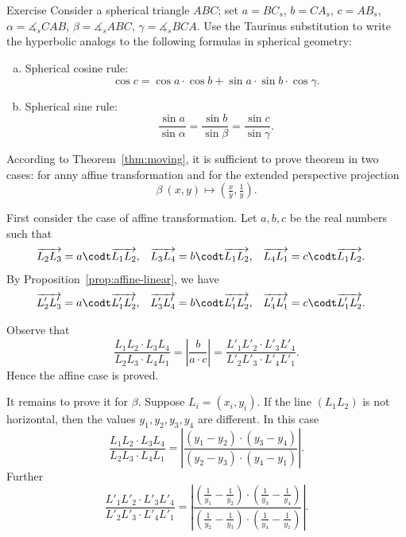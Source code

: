 \begin{thm}{Exercise}
Consider a spherical triangle $ABC$; set
$a=BC_s$, $b=CA_s$, $c=AB_s$,
$\alpha=\measuredangle_sCAB$, $\beta=\measuredangle_sABC$, $\gamma=\measuredangle_sBCA$.
Use the Taurinus substitution to write the hyperbolic analogs to the following formulas in spherical geometry:

\begin{enumerate}[(a)]
\item Spherical cosine rule:
\[\cos c=\cos a \cdot \cos b+\sin a\cdot \sin b\cdot \cos\gamma.\]
\item
Spherical sine rule:
\[\frac{\sin a}{\sin \alpha}=\frac{\sin b}{\sin \beta}=\frac{\sin c}{\sin \gamma}.\]
\end{enumerate}
 
\end{thm}















According to Theorem~\ref{thm:moving}, it is sufficient to prove theorem in two cases: for anny affine transformation and for the extended perspective projection
\[\beta\:(x,y)\mapsto (\tfrac xy,\tfrac 1y).\]

First consider the case of affine transformation.
Let $a,b,c$ be the real numbers such that
\begin{align*}\overrightarrow{L_2L_3}&=a\codt\overrightarrow{L_1L_2},& \overrightarrow{L_3L_4}&=b\codt\overrightarrow{L_1L_2},&
\overrightarrow{L_4L_1}&=c\codt\overrightarrow{L_1L_2}.
\end{align*}
By Proposition~\ref{prop:affine-linear}, we have 
\begin{align*}
\overrightarrow{L_2'L_3'}&=a\codt\overrightarrow{L_1'L_2'},& \overrightarrow{L_3'L_4'}&=b\codt\overrightarrow{L_1'L_2'},&
\overrightarrow{L_4'L_1'}&=c\codt\overrightarrow{L_1'L_2'}.
\end{align*}

Observe that 
\[\frac{L_1L_2\cdot L_3L_4}{L_2L_3\cdot L_4L_1}
=\left|\frac{b}{a\cdot c}\right|
=\frac{L'_1L'_2\cdot L'_3L'_4}{L'_2L'_3\cdot L'_4L'_1}.\]
Hence the affine case is proved.

It remains to prove it for $\beta$.
Suppose $L_i=(x_i,y_i)$.
If the line $(L_1L_2)$ is not horizontal, then the values $y_1,y_2,y_3,y_4$ are different.
In this case 
\[\frac{L_1L_2\cdot L_3L_4}{L_2L_3\cdot L_4L_1}
=\left|\frac{(y_1-y_2)\cdot(y_3-y_4)}{(y_2-y_3)\cdot (y_4-y_1)}\right|.\]
Further 
\[\frac{L'_1L'_2\cdot L'_3L'_4}{L'_2L'_3\cdot L'_4L'_1}
=\left|\frac{(\tfrac1{y_1}-\tfrac1{y_2})\cdot(\tfrac1{y_3}-\tfrac1{y_4})}{(\tfrac1{y_2}-\tfrac1{y_3})\cdot (\tfrac1{y_4}-\tfrac1{y_1})}\right|.\]
\qeds




















